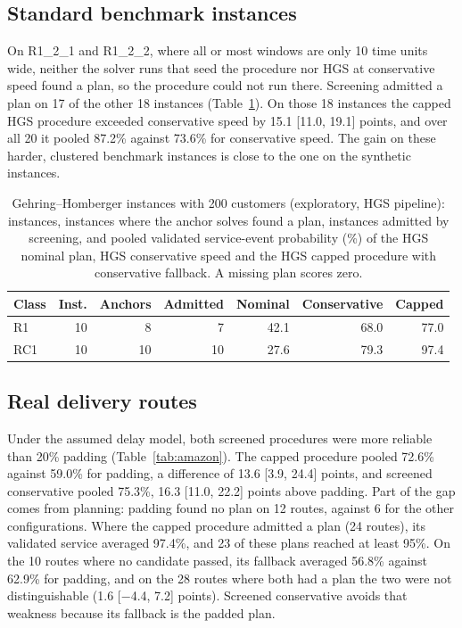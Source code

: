 \documentclass[12pt,letterpaper]{article}
\begin{document}
\subsection{Standard benchmark instances}

On R1\_2\_1 and R1\_2\_2, where all or most windows are only 10 time units wide,
neither the solver runs that seed the procedure nor HGS at conservative speed found a
plan, so the procedure could not run there. Screening admitted a plan on
17 of the other 18 instances (Table~\ref{tab:gh}). On those
18 instances the capped HGS procedure exceeded conservative speed by
15.1 [11.0, 19.1] points, and over all 20 it pooled 87.2\%
against 73.6\% for conservative speed. The gain on these harder, clustered
benchmark instances is close to the one on the synthetic instances.

\begin{table}[t]
\centering
\footnotesize
\setlength{\tabcolsep}{4pt}
\caption{Gehring--Homberger instances with 200 customers (exploratory, HGS pipeline): instances, instances where the anchor solves found a plan, instances admitted by screening, and pooled validated service-event probability (\%) of the HGS nominal plan, HGS conservative speed and the HGS capped procedure with conservative fallback. A missing plan scores zero.}
\label{tab:gh}
\begin{tabular}{@{}lrrrrrr@{}}
\toprule
Class & Inst. & Anchors & Admitted & Nominal & Conservative & Capped\\
\midrule
R1 & 10 & 8 & 7 & 42.1 & 68.0 & 77.0\\
RC1 & 10 & 10 & 10 & 27.6 & 79.3 & 97.4\\
\bottomrule
\end{tabular}
\end{table}

\subsection{Real delivery routes}

Under the assumed delay model, both screened procedures were more reliable than
20\% padding (Table~\ref{tab:amazon}). The capped procedure pooled 72.6\%
against 59.0\% for padding, a difference of 13.6 [3.9,
24.4] points, and screened conservative pooled 75.3\%, 16.3
[11.0, 22.2] points above padding. Part of the gap comes from
planning: padding found no plan on 12 routes, against 6 for
the other configurations. Where the capped procedure admitted a plan
(24 routes), its validated service averaged 97.4\%, and
23 of these plans reached at least 95\%. On the
10 routes where no candidate passed, its fallback averaged
56.8\% against 62.9\% for padding, and on the
28 routes where both had a plan the two were not distinguishable
(1.6 [$-$4.4, 7.2] points). Screened conservative
avoids that weakness because its fallback is the padded plan.
\end{document}
